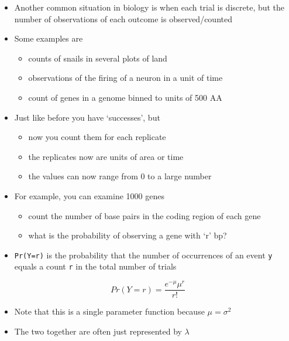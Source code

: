 \documentclass[]{book}
\providecommand{\tightlist}{%
  \setlength{\itemsep}{0pt}\setlength{\parskip}{0pt}}
\begin{document}
\begin{itemize}
\item
  Another common situation in biology is when each trial is discrete, but the number of observations of each outcome is observed/counted
\item
  Some examples are

  \begin{itemize}
  \tightlist
  \item
    counts of snails in several plots of land
  \item
    observations of the firing of a neuron in a unit of time
  \item
    count of genes in a genome binned to units of 500 AA
  \end{itemize}
\item
  Just like before you have `successes', but

  \begin{itemize}
  \tightlist
  \item
    now you count them for each replicate
  \item
    the replicates now are units of area or time
  \item
    the values can now range from 0 to a large number
  \end{itemize}
\end{itemize}

\begin{itemize}
\tightlist
\item
  For example, you can examine 1000 genes

  \begin{itemize}
  \tightlist
  \item
    count the number of base pairs in the coding region of each gene
  \item
    what is the probability of observing a gene with `r' bp?
  \end{itemize}
\item
  \texttt{Pr(Y=r)} is the probability that the number of occurrences of an event \texttt{y} equals a count \texttt{r} in the total number of trials
\end{itemize}

\[Pr(Y=r) = \frac{e^{-\mu}\mu^r}{r!}\]

\begin{itemize}
\tightlist
\item
  Note that this is a single parameter function because \(\mu = \sigma^2\)
\item
  The two together are often just represented by \(\lambda\)
\end{itemize}
\end{document}
